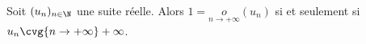 Soit $(u_n)_{n\in\N}$ une suite réelle. \newline Alors  $1 = \underset{n\to+\infty}o(u_n)$ si et seulement si $u_n \cvg{n\to+\infty} +\infty$.

\begin{reponses}
\end{reponses}

